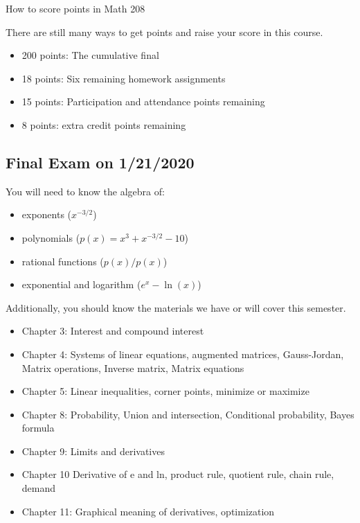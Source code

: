 \documentclass[11pt]{article}
\begin{document}
	
\begin{center} {\large How to score points in Math 208}\end{center}

There are still many ways to get points and raise your score in this course.
\begin{itemize}
	\item 200 points: The cumulative final
	\item 18 points: Six remaining homework assignments
	\item 15 points: Participation and attendance points remaining
	\item 8 points: extra credit points remaining
\end{itemize}


\subsection*{Final Exam on 1/21/2020}
You will need to know the algebra of:
\begin{itemize}
	\item exponents ($x^{-3/2}$)
	\item polynomials ($p(x) = x^3 + x^{-3/2} - 10$)
	\item rational functions ($p(x)/p(x)$)
	\item exponential and logarithm ($e^x - \ln(x)$)
\end{itemize}
Additionally, you should know the materials we have or will cover this semester.
\begin{itemize}
	\item Chapter 3: Interest and compound interest
	\item Chapter 4: Systems of linear equations, augmented matrices, Gauss-Jordan, Matrix operations, Inverse matrix, Matrix equations
	\item Chapter 5: Linear inequalities, corner points, minimize or maximize
	\item Chapter 8: Probability, Union and intersection, Conditional probability, Bayes formula
	\item Chapter 9: Limits and derivatives
	\item Chapter 10 Derivative of e and ln, product rule, quotient rule, chain rule, demand
	\item Chapter 11: Graphical meaning of derivatives, optimization
\end{itemize}
\end{document}
